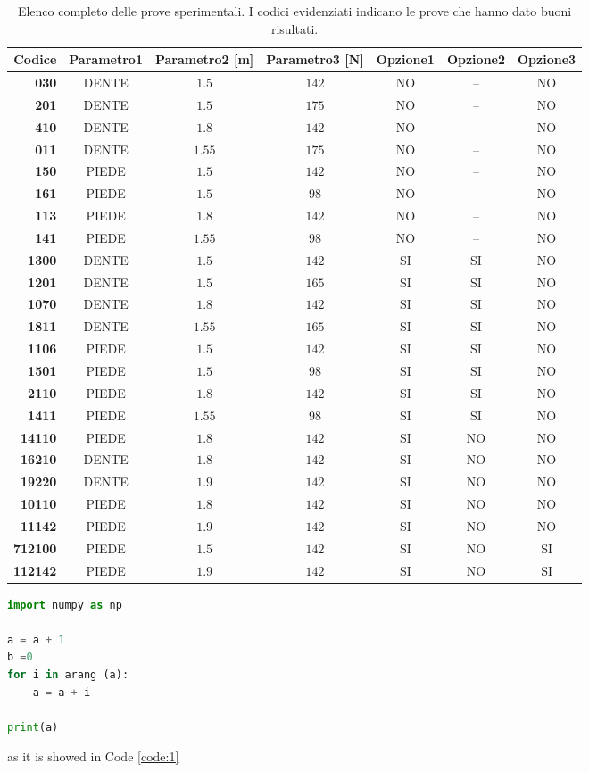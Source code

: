 \begin{sidewaystable}
%
\caption[Elenco completo delle prove sperimentali]{Elenco completo delle prove sperimentali. I {\color{webbrown} codici evidenziati} indicano le prove che hanno dato buoni risultati.}
%
\label{tab:sidewaystable}
%
\centering
%
\begin{tabular}{>{\bfseries}r c c c c c c}
%
\toprule
%
\textbf{Codice} & %
	\textbf{Parametro1}	& \textbf{Parametro2 [m]}	 & \textbf{Parametro3 [N]} %
							& \textbf{Opzione1} %
									& \textbf{Opzione2} %
											& \textbf{Opzione3}\\ 
%
\midrule
%
030  	& DENTE		& $1.5$		& $142$ 	& NO	& --	& NO\\ 
%
{\color{webbrown} 201}  	& DENTE		& $1.5$		& $175$ 	& NO	& --	& NO\\ 
%
410  	& DENTE		& $1.8$		& $142$ 	& NO	& --	& NO\\ 
%
{\color{webbrown} 011}  	& DENTE		& $1.55$		& $175$ 	& NO	& --	& NO\\ 
%
150  	& PIEDE		& $1.5$		& $142$ 	& NO	& --	& NO\\ 
%
{\color{webbrown} 161}  	& PIEDE		& $1.5$		& $98$ 	& NO	& --	& NO\\ 
%
113 	& PIEDE		& $1.8$		& $142$ 	& NO	& --	& NO\\ 
%
{\color{webbrown} 141}  	& PIEDE		& $1.55$		& $98$ 	& NO	& --	& NO\\ 
%
\midrule
%
{\color{webbrown} 1300}  	& DENTE		& $1.5$		& $142$ 		& SI 	& SI 	& NO\\
%
1201  	& DENTE		& $1.5$		& $165$ 		& SI 	& SI 	& NO\\
%
{\color{webbrown} 1070}  	& DENTE		& $1.8$		& $142$ 		& SI 	& SI 	& NO\\
%
1811  	& DENTE		& $1.55$		& $165$ 		& SI 	& SI 	& NO\\
%
{\color{webbrown} 1106}  	& PIEDE		& $1.5$		& $142$ 		& SI 	& SI 	& NO\\
%
1501  	& PIEDE		& $1.5$		& $98$ 		& SI 	& SI 	& NO\\
%
{\color{webbrown} 2110}  	& PIEDE		& $1.8$		& $142$ 		& SI 	& SI 	& NO\\
%
1411  	& PIEDE		& $1.55$		& $98$ 		& SI 	& SI 	& NO\\
%
\midrule
%
14110  	& PIEDE		& $1.8$		& $142$ 		& SI 	& NO 	& NO\\
%
16210  	& DENTE		& $1.8$		& $142$ 		& SI 	& NO 	& NO\\
%
19220  	& DENTE		& $1.9$		& $142$ 		& SI 	& NO 	& NO\\
%
10110  	& PIEDE		& $1.8$		& $142$ 		& SI 	& NO 	& NO\\
%
11142  	& PIEDE		& $1.9$		& $142$ 		& SI 	& NO 	& NO\\
%
\midrule
%
{\color{webbrown} 712100}  	& PIEDE		& $1.5$		& $142$ 		& SI 	& NO	& SI\\
%
112142  	& PIEDE		& $1.9$		& $142$ 		& SI 	& NO	& SI\\
%
\bottomrule 
%
\end{tabular}
%
\end{sidewaystable}
%

\begin{lstlisting}[language=Python, caption=pollo, label=code:1]
import numpy as np

a = a + 1
b =0
for i in arang (a):
	a = a + i
	
print(a)
\end{lstlisting}

as it is showed in Code \ref{code:1}